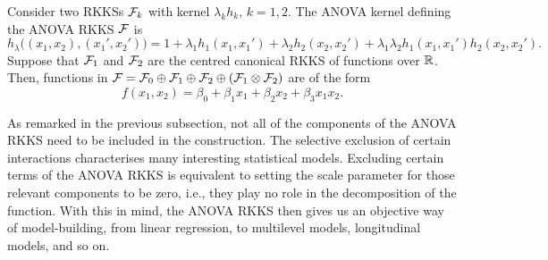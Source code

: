 
\begin{example}
  Consider two RKKSs ${\mathcal F}_k$ with kernel $\lambda_k h_k$, $k=1,2$.
  The ANOVA kernel defining the ANOVA RKKS ${\mathcal F}$ is
  \[
    h_\lambda\big((x_1,x_2),(x_1',x_2') \big) = 1 + \lambda_1 h_1(x_1,x_1') + \lambda_2 h_2(x_2,x_2') + \lambda_1\lambda_2 h_1(x_1,x_1')h_2(x_2,x_2').
  \]  
  Suppose that ${\mathcal F}_1$ and ${\mathcal F}_2$ are the centred canonical RKKS of functions over $\mathbb{R}$.
  Then, functions in ${\mathcal F} = {\mathcal F}_0 \oplus {\mathcal F}_1 \oplus {\mathcal F}_2 \oplus ({\mathcal F}_1 \otimes {\mathcal F}_2)$ are of the form
  \[
    f(x_1,x_2) = \beta_0 + \beta_1x_1 + \beta_2x_2 + \beta_3x_1x_2.
  \]
\end{example}

As remarked in the previous subsection, not all of the components of the ANOVA RKKS need to be included in the construction.
The selective exclusion of certain interactions characterises many interesting statistical models.
Excluding certain terms of the ANOVA RKKS is equivalent to setting the scale parameter for those relevant components to be zero, i.e., they play no role in the decomposition of the function.
With this in mind, the ANOVA RKKS then gives us an objective way of model-building, from linear regression, to multilevel models, longitudinal models, and so on.


